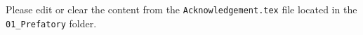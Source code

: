 Please edit or clear the content from the \texttt{Acknowledgement.tex} file located in the \texttt{01\_Prefatory} folder.
